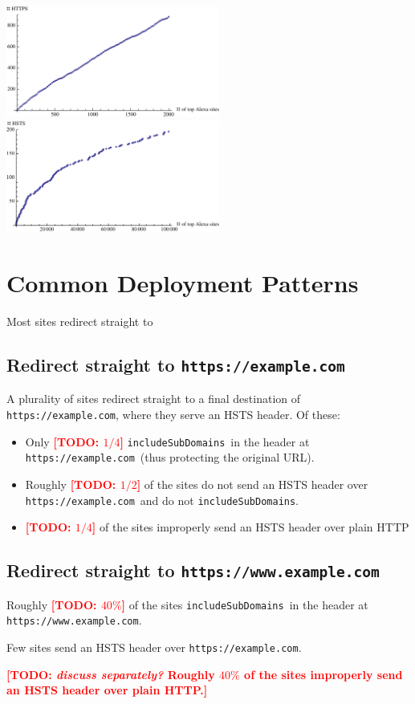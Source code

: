 \documentclass[conference]{./IEEEtran}
\newcommand{\todo}[1]{\textcolor{red}{\textbf{[TODO: #1]}}}
\newcommand{\td}[2]{\textcolor{red}{\textbf{[TODO: {\it{#1}} #2]}}}
\newcommand{\site}[1]{\texttt{#1}}
\newcommand{\code}[1]{\texttt{#1}}
\newcommand{\iSD}{{\code{includeSubDomains}}}
\newcommand{\genericsite}{example.com}
\newcommand{\s}{{\site{https://\genericsite}}}
\newcommand{\sw}{{\site{https://www.\genericsite}}}
\theoremstyle{plain}
\begin{document}
\begin{center}
\includegraphics[width=70mm]{alexa_https.pdf}
\includegraphics[width=70mm]{alexa_hsts.pdf}
\end{center}

\section{Common Deployment Patterns}

Most sites redirect straight to 

\subsection{Redirect straight to \s}

A plurality of sites redirect straight to a final destination of \s, where they serve an HSTS header. Of these:

\begin{itemize}
\item Only \todo{$1/4$} \iSD~in the header at \s~(thus protecting the original URL).
\item Roughly \todo{$1/2$} of the sites do not send an HSTS header over \s~and do not \iSD.
\item \todo{$1/4$} of the sites improperly send an HSTS header over plain HTTP%
\end{itemize}

\subsection{Redirect straight to \sw}

\item Roughly \todo{$40\%$} of the sites \iSD~in the header at \sw.
\item Few sites send an HSTS header over \s.
\item \td{discuss separately?}{Roughly $40\%$ of the sites improperly send an HSTS header over plain HTTP.}
\end{document}
